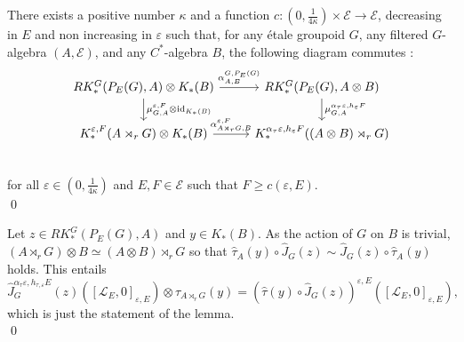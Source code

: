 \begin{lem}\label{KunnethLemma}
There exists a positive number $\kappa$ and a function $c : (0,\frac{1}{4\kappa})\times\mathcal E\rightarrow \mathcal E$, decreasing in $E$ and non increasing in $\varepsilon$ such that, for any étale groupoid $G$, any filtered $G$-algebra $(A,\mathcal E)$, and any $C^*$-algebra $B$, the following diagram commutes :
\[\begin{tikzcd}
RK_*^G(P_E(G),A)\otimes K_*(B) \arrow{r}{\alpha^{G,P_E(G)}_{A,B}}\arrow{d}{\mu_{G,A}^{\varepsilon,F}\otimes \text{id}_{K_*(B)}} & 
RK_*^G(P_E(G),A\otimes B) \arrow{d}{\mu_{G,A}^{\alpha_ \tau\varepsilon,h_\varepsilon F}} \\
K_*^{\varepsilon,F}(A\rtimes_r G)\otimes K_*(B) \arrow{r}{\alpha_{A\rtimes_r G,B}^{\varepsilon,F}} & 
K_*^{\alpha_\tau\varepsilon,h_{\varepsilon}F}((A\otimes B)\rtimes_r G)\\
\end{tikzcd}\] 
for all $\varepsilon\in(0,\frac{1}{4\kappa})$ and $E,F\in\mathcal E$ such that $F\geq c(\varepsilon,E)$. \\
\qed
\end{lem}

\begin{dem}
Let $z\in RK_*^G(P_E(G),A)$ and $y\in K_*(B)$. As the action of $G$ on $B$ is trivial, $(A\rtimes_r G)\otimes B\simeq (A\otimes B)\rtimes_r G$ so that $\hat\tau_A(y)\circ \hat J_{G}(z) \sim \hat J_{G}(z)\circ \hat\tau_A(y) $ holds. This entails
\[\hat J_G^{\alpha_\tau\varepsilon, h_{\tau,\varepsilon}E}(z)\left([\mathcal L_E,0]_{\varepsilon, E} \right)\otimes \tau_{A\rtimes_r G}(y) = 
\left( \hat\tau(y)\circ \hat J_G(z) \right)^{\varepsilon, E}\left([\mathcal L_E,0]_{\varepsilon, E}\right),\]
which is just the statement of the lemma.\\
\qed
\end{dem}


